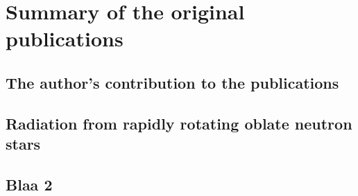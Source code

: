 \chapter{Summary of the original publications}





\section{The author's contribution to the publications} 

\section{Radiation from rapidly rotating oblate neutron stars}



\section{Blaa 2}
